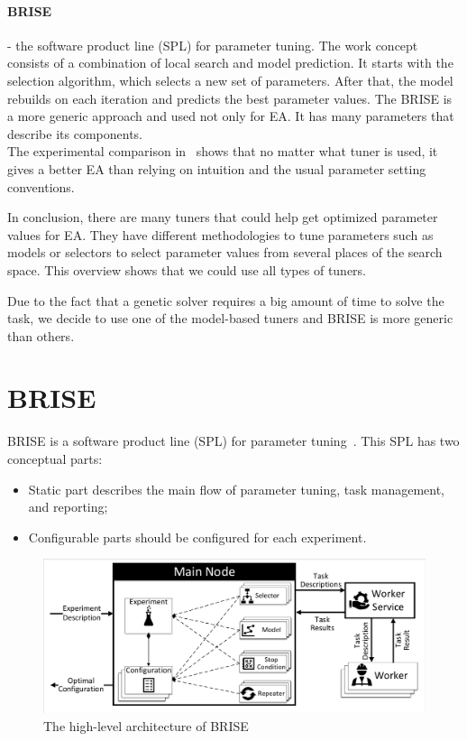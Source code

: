 \paragraph{BRISE} - the software product line (SPL) for parameter tuning. The work concept consists of a combination of local search and model prediction. It starts with the selection algorithm, which selects a new set of parameters. After that, the model rebuilds on each iteration and predicts the best parameter values. The BRISE is a more generic approach and used not only for EA. It has many parameters that describe its components. \\

The experimental comparison in~\cite{smit2009comparing} shows that no matter what tuner is used, it gives a better EA than relying on intuition and the usual parameter setting conventions.

In conclusion, there are many tuners that could help get optimized parameter values for EA. They have different methodologies to tune parameters such as models or selectors to select parameter values from several places of the search space. This overview shows that we could use all types of tuners. 

Due to the fact that a genetic solver requires a big amount of time to solve the task, we decide to use one of the model-based tuners and BRISE is more generic than others.


\section{BRISE}\label{sec:BRISE}

BRISE is a software product line (SPL) for parameter tuning~\cite{pukhkaiev19}.
This SPL has two conceptual parts:

\begin{itemize}
	\item Static part describes the main flow of parameter tuning, task management, and reporting;
	\item Configurable parts should be configured for each experiment.
\end{itemize}

\begin{figure}
	\centering
	\includegraphics[width=\textwidth]{images/BRISEarch.pdf}
	\caption[The high-level architecture of BRISE]{The high-level architecture of BRISE}
	\label{fig:BRISEarch}
\end{figure}

